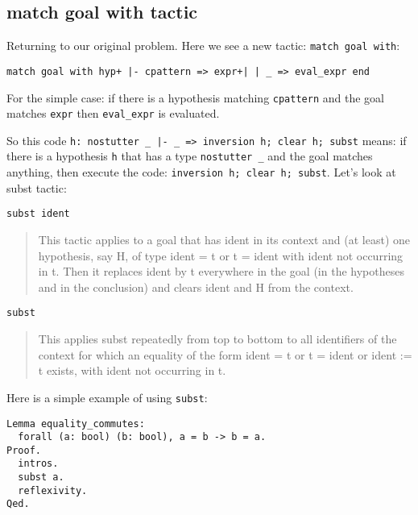 \documentclass[12pt]{article}
\begin{document}
\subsection{match goal with tactic}

Returning to our original problem. Here we see a new tactic: {\tt match goal with}:

\begin{verbatim}
match goal with hyp+ |- cpattern => expr+| | _ => eval_expr end
\end{verbatim}

For the simple case: if there is a hypothesis matching {\tt cpattern} and the goal matches {\tt expr} then {\tt eval\_expr} is evaluated.

So this code {\tt h: nostutter \_ |- \_ => inversion h; clear h; subst} means: if there is a hypothesis {\tt h} that has a type {\tt nostutter \_} and the goal matches anything, then execute the code: {\tt inversion h; clear h; subst}. Let's look at subst tactic:

\begin{verbatim}
subst ident
\end{verbatim}

\begin{quote}
This tactic applies to a goal that has ident in its context and (at least) one hypothesis, say H, of type ident = t or t = ident with ident not occurring in t. Then it replaces ident by t everywhere in the goal (in the hypotheses and in the conclusion) and clears ident and H from the context.
\end{quote}

\begin{verbatim}
subst
\end{verbatim}

\begin{quote}
This applies subst repeatedly from top to bottom to all identifiers of the context for which an equality of the form ident = t or t = ident or ident := t exists, with ident not occurring in t.
\end{quote}

Here is a simple example of using {\tt subst}:

\begin{verbatim}
Lemma equality_commutes:
  forall (a: bool) (b: bool), a = b -> b = a.
Proof.
  intros.
  subst a.
  reflexivity.
Qed.
\end{verbatim}
\end{document}
